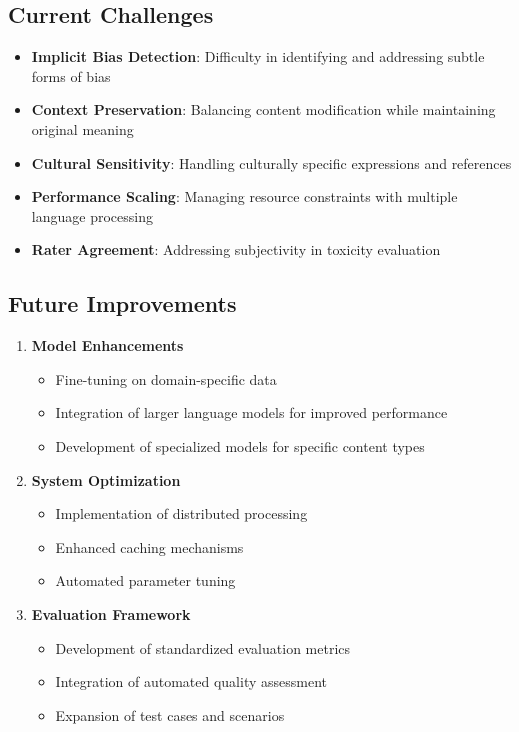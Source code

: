 \documentclass[11pt]{article}
\begin{document}
\subsection{Current Challenges}
\begin{itemize}
    \item \textbf{Implicit Bias Detection}: Difficulty in identifying and addressing subtle forms of bias
    \item \textbf{Context Preservation}: Balancing content modification while maintaining original meaning
    \item \textbf{Cultural Sensitivity}: Handling culturally specific expressions and references
    \item \textbf{Performance Scaling}: Managing resource constraints with multiple language processing
    \item \textbf{Rater Agreement}: Addressing subjectivity in toxicity evaluation
\end{itemize}

\subsection{Future Improvements}
\begin{enumerate}
    \item \textbf{Model Enhancements}
    \begin{itemize}
        \item Fine-tuning on domain-specific data
        \item Integration of larger language models for improved performance
        \item Development of specialized models for specific content types
    \end{itemize}
    
    \item \textbf{System Optimization}
    \begin{itemize}
        \item Implementation of distributed processing
        \item Enhanced caching mechanisms
        \item Automated parameter tuning
    \end{itemize}
    
    \item \textbf{Evaluation Framework}
    \begin{itemize}
        \item Development of standardized evaluation metrics
        \item Integration of automated quality assessment
        \item Expansion of test cases and scenarios
    \end{itemize}
\end{enumerate}
\end{document}
